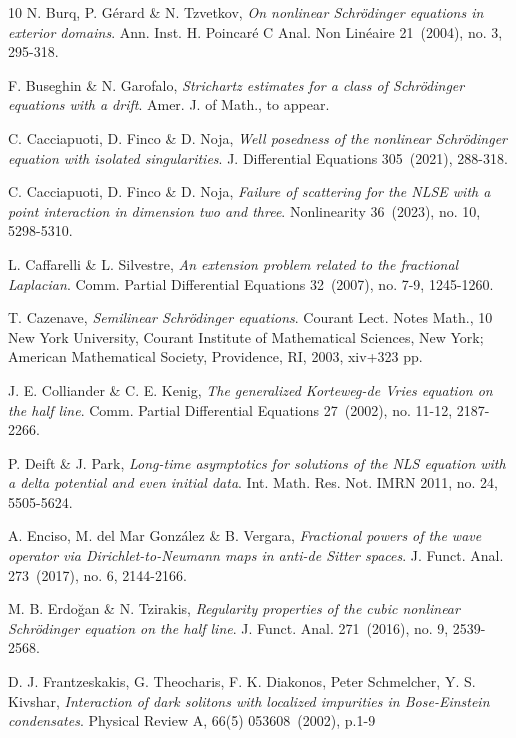 \documentclass[11pt,letter]{amsart}
\numberwithin{equation}{section}
\numberwithin{equation}{section}
\begin{document}
\begin{thebibliography}{10}
N. Burq, P. G\'erard \& N. Tzvetkov, \emph{
On nonlinear Schr\"odinger equations in exterior domains}.
Ann. Inst. H. Poincar\'e C Anal. Non Lin\'eaire 21~(2004), no. 3, 295-318.

F. Buseghin \& N. Garofalo, \emph{Strichartz estimates for a class of Schr\"odinger  equations with a drift}. Amer. J. of Math., to appear.

C. Cacciapuoti, D. Finco \& D. Noja,  \emph{Well posedness of the nonlinear Schr\"odinger equation with isolated singularities}.
J. Differential Equations 305~(2021), 288-318.

C. Cacciapuoti, D. Finco \& D. Noja,  \emph{Failure of scattering for the NLSE with a point interaction in dimension two and three}.
Nonlinearity 36~(2023), no. 10, 5298-5310.

L. Caffarelli \& L. Silvestre, \emph{An extension problem related to the fractional Laplacian}.
Comm. Partial Differential Equations 32~(2007), no. 7-9, 1245-1260.

 T. Cazenave, \emph{Semilinear Schr\"odinger equations}. Courant Lect. Notes Math., 10
New York University, Courant Institute of Mathematical Sciences, New York; American Mathematical Society, Providence, RI, 2003, xiv+323 pp.

J. E. Colliander \&  C. E. Kenig,  \emph{The generalized Korteweg-de Vries equation on the half line}.
Comm. Partial Differential Equations 27~(2002), no. 11-12, 2187-2266.

P. Deift \& J. Park, \emph{
Long-time asymptotics for solutions of the NLS equation with a delta potential and even initial data}.
Int. Math. Res. Not. IMRN 2011, no. 24, 5505-5624.

A. Enciso, M. del Mar Gonz\'alez \& B. Vergara, \emph{
Fractional powers of the wave operator via Dirichlet-to-Neumann maps in anti-de Sitter spaces}.
J. Funct. Anal. 273~(2017), no. 6, 2144-2166.



M. B. Erdoğan \& N. Tzirakis, \emph{ Regularity properties of the cubic nonlinear Schr\"odinger equation on the half line}.
J. Funct. Anal. 271~(2016), no. 9, 2539-2568.

D. J. Frantzeskakis, G. Theocharis, F. K. Diakonos, Peter Schmelcher, Y. S. Kivshar, \emph{ Interaction of dark solitons with localized impurities in Bose-Einstein condensates}. Physical Review A, 66(5) 053608~(2002), p.1-9 


\end{thebibliography}
\end{document}
